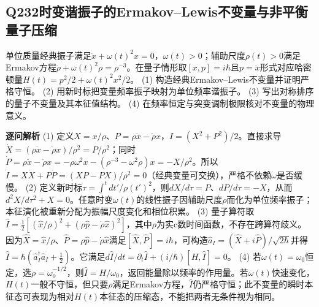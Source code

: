 \subsection*{Q232\quad 时变谐振子的Ermakov–Lewis不变量与非平衡量子压缩}
单位质量经典振子满足$\ddot x+\omega(t)^2x=0$，$\omega(t)>0$；辅助尺度$\rho(t)>0$满足Ermakov方程$\ddot\rho+\omega(t)^2\rho=\rho^{-3}$。在量子情形取$[x,p]=i\hbar$且$p=\dot x$形式对应哈密顿量$H(t)=p^2/2+\omega(t)^2x^2/2$。
(1) 构造经典Ermakov–Lewis不变量并证明严格守恒。
(2) 用新时标把变量频率振子映射为单位频率谐振子。
(3) 写出对称排序的量子不变量及其本征值结构。
(4) 在频率恒定与突变调制极限核对不变量的物理意义。
\par\textbf{逐问解析}
(1) 定义$X=x/\rho$、$P=\rho\dot x-\dot\rho x$，$I=(X^2+P^2)/2$。直接求导$\dot X=(\rho\dot x-\dot\rho x)/\rho^2=P/\rho^2$；同时$\dot P=\rho\ddot x-\ddot\rho x=-\rho\omega^2x-(\rho^{-3}-\omega^2\rho)x=-X/\rho^2$。所以$\dot I=X\dot X+P\dot P=(XP-PX)/\rho^2=0$（经典变量可交换），严格不依赖$\dot\omega$是否缓慢。
(2) 定义新时标$\tau=\int^tdt'/\rho(t')^2$，则$dX/d\tau=P$、$dP/d\tau=-X$，从而$d^2X/d\tau^2+X=0$。任意时变$\omega(t)$的线性振子因辅助尺度$\rho$而化为单位频率振子；本征演化被重新分配为振幅尺度变化和相位积累。
(3) 量子算符取$\hat I=\tfrac12[(\hat x/\rho)^2+(\rho\hat p-\dot\rho\hat x)^2]$，其中$\rho$为实c数时间函数，不存在跨算符歧义。因为$\hat X=\hat x/\rho$、$\hat P=\rho\hat p-\dot\rho\hat x$满足$[\hat X,\hat P]=i\hbar$，可构造$\hat a_I=(\hat X+i\hat P)/\sqrt{2\hbar}$并得$\hat I=\hbar(\hat a_I^\dagger\hat a_I+\tfrac12)$。它满足$d\hat I/dt=\partial_t\hat I+(i/\hbar)[H,\hat I]=0$。
(4) 若$\omega(t)=\omega_0$恒定，选$\rho=\omega_0^{-1/2}$，则$\hat I=H/\omega_0$，返回能量除以频率的作用量。若$\omega(t)$快速变化，$H(t)$一般不守恒，但只要$\rho$满足Ermakov方程，$\hat I$仍严格守恒；此不变量的瞬时本征态可表现为相对$H(t)$本征态的压缩态，不能把两者无条件视为相同。
\par\medskip
